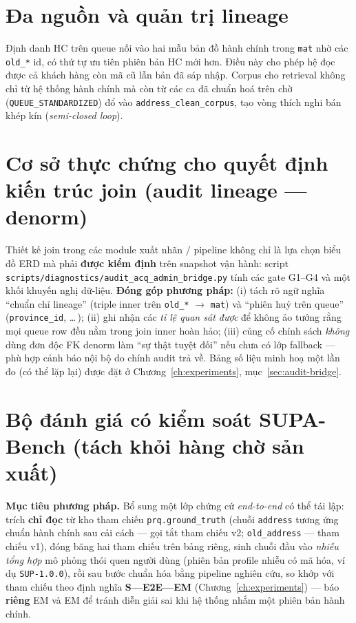 \section{Đa nguồn và quản trị lineage}
Định danh HC trên queue nối vào hai mẫu bản đồ hành chính trong \texttt{mat} nhờ các \texttt{old\_*} id, có thứ tự ưu tiên phiên bản HC mới hơn. Điều này cho phép hệ đọc được cả khách hàng còn mã cũ lẫn bản đã sáp nhập. Corpus cho retrieval không chỉ từ hệ thống hành chính mà còn từ các ca đã chuẩn hoá trên chờ (\texttt{QUEUE\_STANDARDIZED}) đổ vào \texttt{address\_clean\_corpus}, tạo vòng thích nghi bán khép kín (\emph{semi-closed loop}).

\section{Cơ sở thực chứng cho quyết định kiến trúc join (audit lineage --- denorm)}
Thiết kế join trong các module xuất nhãn / pipeline không chỉ là lựa chọn biểu đồ ERD mà phải \textbf{được kiểm định} trên snapshot vận hành: script \texttt{scripts/diagnostics/audit\_acq\_admin\_bridge.py} tính các gate G1--G4 và một khối khuyến nghị dữ-liệu. \textbf{Đóng góp phương pháp:} (i) tách rõ ngữ nghĩa ``chuẩn chỉ lineage'' (triple inner trên \texttt{old\_*} \(\rightarrow\) \texttt{mat}) và ``phiên huỷ trên queue'' (\texttt{province\_id}, \ldots\,); (ii) ghi nhận các \emph{tỉ lệ quan sát được} để không ảo tưởng rằng mọi queue row đều nằm trong join inner hoàn hảo; (iii) củng cố chính sách \emph{không} dùng đơn độc FK denorm làm ``sự thật tuyệt đối'' nếu chưa có lớp fallback --- phù hợp cảnh báo nội bộ do chính audit trả về. Bảng số liệu minh hoạ một lần đo (có thể lặp lại) được đặt ở Chương~\ref{ch:experiments}, mục~\ref{sec:audit-bridge}.

\section{Bộ đánh giá có kiểm soát SUPA-Bench (tách khỏi hàng chờ sản xuất)}
\label{sec:supa-bench-design}

\textbf{Mục tiêu phương pháp.} Bổ sung một lớp chứng cứ \emph{end-to-end} có thể tái lập: trích \textbf{chỉ đọc} từ kho tham chiếu \texttt{prq.ground\_truth} (chuỗi \texttt{address} tương ứng chuẩn hành chính sau cải cách --- gọi tắt tham chiếu v2; \texttt{old\_address} --- tham chiếu v1), đóng băng hai tham chiếu trên bảng riêng, sinh chuỗi đầu vào \emph{nhiễu tổng hợp} mô phỏng thói quen người dùng (phiên bản profile nhiễu có mã hóa, ví dụ \texttt{SUP-1.0.0}), rồi sau bước chuẩn hóa bằng pipeline nghiên cứu, so khớp với tham chiếu theo định nghĩa \textbf{S---E2E---EM} (Chương~\ref{ch:experiments}) --- báo \textbf{riêng} EM và EM để tránh diễn giải sai khi hệ thống nhắm một phiên bản hành chính.

